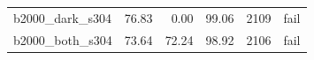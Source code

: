 \begin{table}[htbp]
\begin{tabular}{lrrrrr}
b2000\_\allowbreak{}dark\_\allowbreak{}s304 & %
76.83 & %
0.00 & %
99.06 & %
2109 & %
fail \\ %

b2000\_\allowbreak{}both\_\allowbreak{}s304 & %
73.64 & %
72.24 & %
98.92 & %
2106 & %
fail \\ %


\end{tabular}
\end{table}

